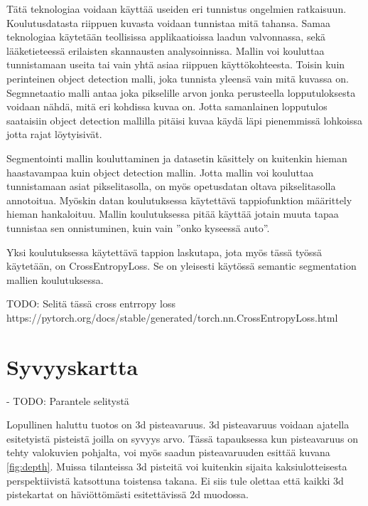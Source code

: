 Tätä teknologiaa voidaan käyttää useiden eri tunnistus ongelmien ratkaisuun.
Koulutusdatasta riippuen kuvasta voidaan tunnistaa mitä tahansa. Samaa teknologiaa käytetään teollisissa applikaatioissa laadun valvonnassa, sekä lääketieteessä erilaisten skannausten analysoinnissa.
Mallin voi kouluttaa tunnistamaan useita tai vain yhtä asiaa riippuen käyttökohteesta.
Toisin kuin perinteinen object detection malli, joka tunnista yleensä vain mitä kuvassa on. Segmnetaatio malli antaa joka pikselille arvon jonka perusteella lopputuloksesta voidaan nähdä, mitä eri kohdissa kuvaa on.
Jotta samanlainen lopputulos saataisiin object detection mallilla pitäisi kuvaa käydä läpi pienemmissä lohkoissa jotta rajat löytyisivät.

Segmentointi mallin kouluttaminen ja datasetin käsittely on kuitenkin hieman haastavampaa kuin object detection mallin. Jotta mallin voi kouluttaa tunnistamaan asiat pikselitasolla, on myös opetusdatan oltava pikselitasolla annotoitua. 
Myöskin datan koulutuksessa käytettävä tappiofunktion määrittely hieman hankaloituu.
Mallin koulutuksessa pitää käyttää jotain muuta tapaa tunnistaa sen onnistuminen, kuin vain ”onko kyseessä auto”.

Yksi koulutuksessa käytettävä tappion laskutapa, jota myös tässä työssä käytetään, on CrossEntropyLoss. Se on yleisesti käytössä semantic segmentation mallien koulutuksessa. 

TODO: Selitä tässä cross entrropy loss https://pytorch.org/docs/stable/generated/torch.nn.CrossEntropyLoss.html

\section{Syvyyskartta}

- TODO: Parantele selitystä

Lopullinen haluttu tuotos on 3d  pisteavaruus. 3d pisteavaruus voidaan ajatella esitetyistä pisteistä joilla on syvyys arvo. Tässä tapauksessa kun pisteavaruus on tehty valokuvien pohjalta, voi myös saadun pisteavaruuden esittää kuvana \ref{fig:depth}. Muissa tilanteissa 3d pisteitä voi kuitenkin sijaita kaksiulotteisesta perspektiivistä katsottuna toistensa takana. Ei siis tule olettaa että kaikki 3d pistekartat on häviöttömästi esitettävissä 2d muodossa. 


